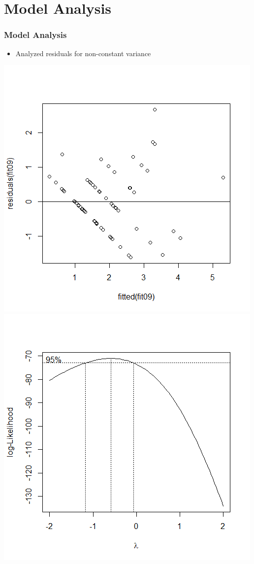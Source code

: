 \documentclass[11pt]{beamer}
\begin{document}
\section{Model Analysis}
\begin{frame}
\frametitle{{\textbf{\huge Model Analysis}}}
\begin{itemize}
	\item Analyzed residuals for non-constant variance
\end{itemize}
	\begin{center}
		\includegraphics[scale=0.35]{preresid.png}
		\includegraphics[scale=0.35]{box1.png}
	\end{center}
\end{frame}
\end{document}
